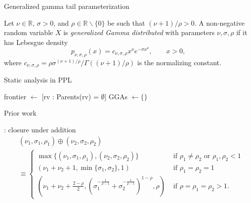 \begin{frame}{Generalized gamma tail parameterization}
    \begin{definition}
        Let $\nu \in \mathbb{R}$, $\sigma > 0$, and $\rho \in \mathbb{R} \backslash \{0\}$ be such that $(\nu+1)/ \rho > 0$.
        A non-negative random variable $X$ is \emph{generalized Gamma distributed} with parameters $\nu,\sigma,\rho$ if it has Lebesgue density
        \begin{equation}
        \label{eq:GenGammaDensity}
        p_{\nu,\sigma,\rho}(x) = c_{\nu,\sigma,\rho} x^\nu e^{-\sigma x^\rho},\qquad x > 0,
        \end{equation}
        where $c_{\nu,\sigma,\rho} = \rho \sigma^{(\nu+1)/\rho} / \Gamma((\nu+1)/\rho)$ is the normalizing constant. %
    \end{definition}
\end{frame}

\begin{subframe}{Static analysis in PPL}
    \begin{algorithm}[H]
    	\caption{Pseudocode for a GGA tails static analysis pass}\label{alg:bfs_typecheck}
    	frontier $\gets$ [rv : Parents(rv) = $\emptyset$]\;
    	GGAs $\gets \{\}$\;
    \end{algorithm}
\end{subframe}

\begin{frame}{Prior work}

    \parencite{resnick2007heavy}: closure under addition
    \begin{align*}
        &  (\nu_{1},\sigma_{1},\rho_{1})\oplus(\nu_{2},\sigma_{2},\rho_{2}) \\
        & \equiv \begin{cases}
            \max\{(\nu_{1},\sigma_{1},\rho_{1}),(\nu_{2},\sigma_{2},\rho_{2})\} & \text{ if }\rho_{1}\neq\rho_{2}\text{ or }\rho_{1},\rho_{2}<1\\
            \left(\nu_{1}+\nu_{2}+1,\min\{\sigma_{1},\sigma_{2}\},1\right) & \text{ if }\rho_{1}=\rho_{2}=1\\
            (\nu_{1}+\nu_{2}+\frac{2-\rho}{2},(\sigma_{1}^{-\frac{1}{\rho-1}}+\sigma_{2}^{-\frac{1}{\rho-1}})^{1-\rho},\rho) & \text{ if }\rho=\rho_{1}=\rho_{2}>1.
        \end{cases}
    \end{align*}
\end{frame}

